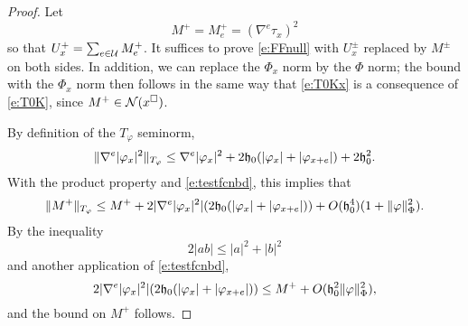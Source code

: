 \begin{proof}
Let
\begin{equation}
M^+ = M^+_e = (\nabla^e \tau_x)^2
\end{equation}
so that $U^+_x = \sum_{e\in\mathcal{U}} M^+_e$.
It suffices to prove \eqref{e:FFnull} with $U^\pm_x$ replaced by $M^\pm$
on both sides.
In addition, we can replace the $\Phi_x$ norm by the $\Phi$ norm;
the bound with the $\Phi_x$ norm then follows in the same way that \eqref{e:T0Kx} is a consequence of \eqref{e:T0K},
since $M^+ \in \mathcal{N}(x^\Box)$.


By definition of the $T_\varphi$ seminorm,
\begin{equation}
\label{e:nabla-phi-sq-bd}
\|\nabla^e |\varphi_x|^2\|_{T_\varphi}
  \le
\nabla^e |\varphi_x|^2 + 2 \mathfrak{h}_0 (|\varphi_x| + |\varphi_{x+e}|) + 2 \mathfrak{h}_0^2.
\end{equation}
With the product property
and \eqref{e:testfcnbd}, this implies that
\begin{equation}
\|M^+\|_{T_\varphi}
  \le
M^+
  + 2 |\nabla^e |\varphi_x|^2| (2 \mathfrak{h}_0 (|\varphi_x| + |\varphi_{x+e}|))
  + O(\mathfrak{h}_0^4) (1 + \|\varphi\|^2_\Phi).
\end{equation}
By the inequality
\begin{equation}
\label{e:young-ineq}
2|ab| \le |a|^2 + |b|^2
\end{equation}
and another application of \eqref{e:testfcnbd},
\begin{equation}
2 |\nabla^e |\varphi_x|^2| (2 \mathfrak{h}_0 (|\varphi_x| + |\varphi_{x+e}|))
  \le
M^+ + O(\mathfrak{h}_0^2 \|\varphi\|^2_\Phi),
\end{equation}
and the bound on $M^+$ follows.


\end{proof}
